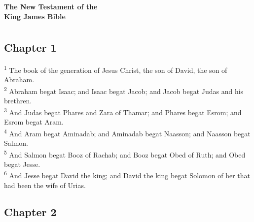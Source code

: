 \documentclass[10pt,twocolumn]{memoir}
\newcommand{\verseref}[2]{\textsuperscript{#2}}
\begin{document}
\thispagestyle{empty}
\begin{center}
\vspace*{3in}
{\Huge\bfseries The New Testament of the\\[0.5em] King James Bible}

\end{center}
\newpage

\tableofcontents*
\newpage

\chapter*{}

\section*{Chapter 1}

\noindent
\verseref{1}{1} The book of the generation of Jesus Christ, the son of David, the son of Abraham.\\
\verseref{1}{2} Abraham begat Isaac; and Isaac begat Jacob; and Jacob begat Judas and his brethren.\\
\verseref{1}{3} And Judas begat Phares and Zara of Thamar; and Phares begat Esrom; and Esrom begat Aram.\\
\verseref{1}{4} And Aram begat Aminadab; and Aminadab begat Naasson; and Naasson begat Salmon.\\
\verseref{1}{5} And Salmon begat Booz of Rachab; and Booz begat Obed of Ruth; and Obed begat Jesse.\\
\verseref{1}{6} And Jesse begat David the king; and David the king begat Solomon of her that had been the wife of Urias.

\section*{Chapter 2}
\end{document}
